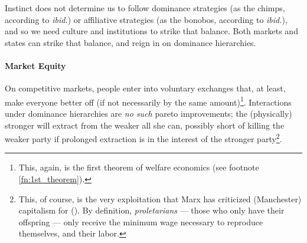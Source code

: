 Instinct does not determine us to follow dominance strategies (as the chimps, according to \emph{ibid.}) or affiliative strategies (as the bonobos, according to \emph{ibid.}), and so we need culture and institutions to strike that balance. Both markets and states can strike that balance, and reign in on dominance hierarchies.

\paragraph{Market Equity}  \label{sec:market_equity} On competitive markets, people enter into voluntary exchanges that, at least, make everyone better off (if not necessarily by the same amount)\footnote{
	This, again, is the first theorem of welfare economics (see footnote \ref{fn:1st_theorem}).}. 
Interactions under dominance hierarchies are \emph{no such} pareto improvements; the (physically) stronger will extract from the weaker all she can, possibly short of killing the weaker party if prolonged extraction is in the interest of the stronger party\footnote{
	This, of course, is the very exploitation that Marx has criticized (Manchester) capitalism for (\citeyear{MarxEngels-1848-aa,Marx-1867-aa}). By definition, \emph{proletarians} --- those who only have their offspring --- only receive the minimum wage necessary to reproduce themselves, and their labor.}.

